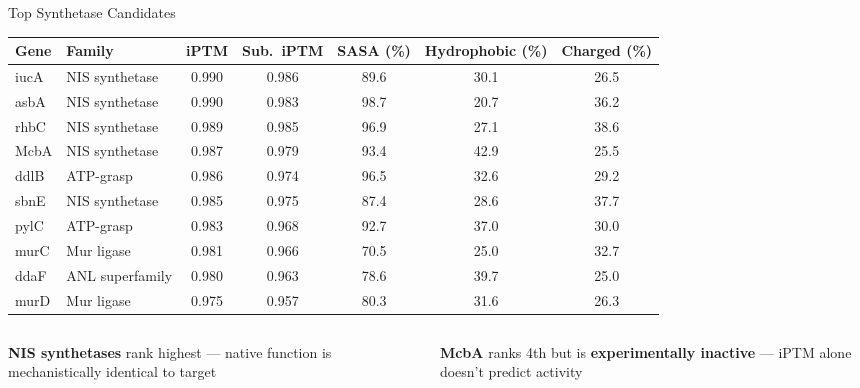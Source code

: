 \documentclass[aspectratio=169, 11pt]{beamer}
\begin{document}
\begin{frame}{Top Synthetase Candidates}
\vspace{-6pt}
\begin{center}
\begin{adjustbox}{max width=\textwidth}
\small
\begin{tabular}{llccccc}
\toprule
\textbf{Gene} & \textbf{Family} & \textbf{iPTM} & \textbf{Sub.~iPTM} & \textbf{SASA (\%)} & \textbf{Hydrophobic (\%)} & \textbf{Charged (\%)} \\
\midrule
iucA & NIS synthetase & 0.990 & 0.986 & 89.6 & 30.1 & 26.5 \\
asbA & NIS synthetase & 0.990 & 0.983 & 98.7 & 20.7 & 36.2 \\
rhbC & NIS synthetase & 0.989 & 0.985 & 96.9 & 27.1 & 38.6 \\
\rowcolor{accentred!15} McbA & NIS synthetase & 0.987 & 0.979 & 93.4 & 42.9 & 25.5 \\
ddlB & ATP-grasp & 0.986 & 0.974 & 96.5 & 32.6 & 29.2 \\
sbnE & NIS synthetase & 0.985 & 0.975 & 87.4 & 28.6 & 37.7 \\
pylC & ATP-grasp & 0.983 & 0.968 & 92.7 & 37.0 & 30.0 \\
murC & Mur ligase & 0.981 & 0.966 & 70.5 & 25.0 & 32.7 \\
ddaF & ANL superfamily & 0.980 & 0.963 & 78.6 & 39.7 & 25.0 \\
murD & Mur ligase & 0.975 & 0.957 & 80.3 & 31.6 & 26.3 \\
\bottomrule
\end{tabular}
\end{adjustbox}
\end{center}

\vspace{4pt}
\begin{columns}[T]
\begin{column}{0.48\textwidth}
\colorbox{lightblue!50}{\parbox{0.92\textwidth}{\centering\small
\textbf{NIS synthetases} rank highest --- native function is mechanistically identical to target
}}
\end{column}
\begin{column}{0.48\textwidth}
\colorbox{accentred!15}{\parbox{0.92\textwidth}{\centering\small
\textbf{McbA} ranks 4th but is \textbf{experimentally inactive} --- iPTM alone doesn't predict activity
}}
\end{column}
\end{columns}
\end{frame}
\end{document}
